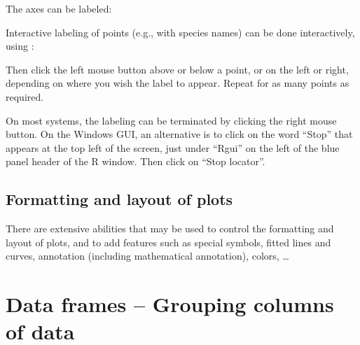 
The axes can be labeled:
\begin{knitrout}
\color{fgcolor}\begin{kframe}
\begin{alltt}
 \hlopt{~}  \hlstd{=}\hlstd{,} \hlstd{=}\hlstd{,}
     \hlstd{=}\hlstd{,} \hlstd{=}\hlstd{)}
\end{alltt}
\end{kframe}
\end{knitrout}

Interactive labeling of points   (e.g., with species names) can
be done interactively, using :
\begin{knitrout}
\color{fgcolor}\begin{kframe}
\begin{alltt}
 \hlopt{~}  
\end{alltt}
\end{kframe}
\end{knitrout}
Then click the left mouse button above or below a point, or on the
left or right, depending on where you wish the label to appear.
Repeat for as many points as required.

On most systems, the labeling can be terminated by clicking the right
mouse button.  On the Windows GUI, an alternative is to click on the
word ``Stop'' that appears at the top left
of the screen, just under ``Rgui'' on the left of the blue panel
header of the R window. Then click on ``Stop locator''.

\subsection*{Formatting and layout of plots}
There are extensive abilities that may be used to control
the formatting and layout of plots, and to add features such as
special symbols, fitted lines and curves, annotation (including
mathematical annotation), colors, \ldots

\section{Data frames -- Grouping columns of data}\label{sec:df}

